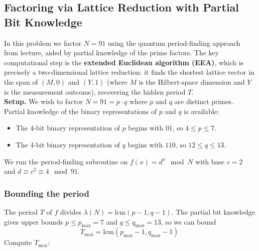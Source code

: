 \newpage
\subsection{Factoring via Lattice Reduction with Partial Bit Knowledge}
In this problem we factor $N=91$ using the quantum period-finding approach from lecture, aided by partial knowledge of the prime factors. The key computational step is the \textbf{extended Euclidean algorithm (EEA)}, which is precisely a two-dimensional lattice reduction: it finds the shortest lattice vector in the span of $(M,0)$ and $(Y,1)$ (where $M$ is the Hilbert-space dimension and $Y$ is the measurement outcome), recovering the hidden period $T$. \\

\textbf{Setup.} We wish to factor $N=91 = p \cdot q$  where $p$ and $q$ are distinct primes. Partial knowledge of the binary representations of $p$ and $q$ is available:
\begin{itemize}
    \item The 4-bit binary representation of $p$ begins with $01$, so $4 \leq p \leq 7$.
    \item The 4-bit binary representation of $q$ begins with $110$, so $12 \leq q \leq 13$.
\end{itemize}
We run the period-finding subroutine on $f(x) = d^x \mod N$ with base $c=2$ and $d \equiv c^2 \equiv 4 \mod 91$.

\subsubsection{Bounding the period}
The period $T$ of $f$ divides $\lambda(N) = \text{lcm}(p-1, q-1)$. The partial bit knowledge gives upper bounds $p \leq p_{\text{max}} = 7$ and $q \leq q_{\text{max}} = 13$, so we can bound
\begin{equation}
    T_{\text{max}} = \text{lcm}(p_{\text{max}} - 1, q_{\text{max}} - 1)
\end{equation}
Compute $T_{\text{max}}$: \\ 
\noindent{}


